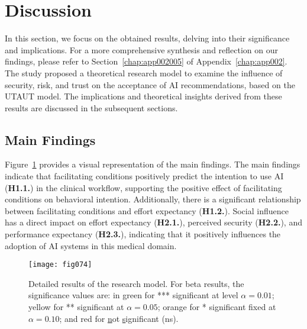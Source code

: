 \section{Discussion}
\label{sec:chap004006}

In this section, we focus on the obtained results, delving into their significance and implications.
For a more comprehensive synthesis and reflection on our findings, please refer to Section~\ref{chap:app002005} of Appendix~\ref{chap:app002}.
The study proposed a theoretical research model to examine the influence of security, risk, and trust on the acceptance of \ac{AI} recommendations, based on the \ac{UTAUT} model.
The implications and theoretical insights derived from these results are discussed in the subsequent sections.

\subsection{Main Findings}
\label{sec:chap004006001}

Figure~\ref{fig:fig074} provides a visual representation of the main findings.
The main findings indicate that facilitating conditions positively predict the intention to use \ac{AI} ({\bf H1.1.}) in the clinical workflow, supporting the positive effect of facilitating conditions on behavioral intention.
Additionally, there is a significant relationship between facilitating conditions and effort expectancy ({\bf H1.2.}).
Social influence has a direct impact on effort expectancy ({\bf H2.1.}), perceived security ({\bf H2.2.}), and performance expectancy ({\bf H2.3.}), indicating that it positively influences the adoption of \ac{AI} systems in this medical domain.

\begin{figure}[htpb]
\centering
\texttt{[image: fig074]}
\caption{Detailed results of the research model. For beta results, the significance values are: in green for *** significant at level $\alpha = 0.01$; yellow for ** significant at $\alpha = 0.05$; orange for * significant fixed at $\alpha = 0.10$; and red for \underline{n}ot \underline{s}ignificant (ns).}
\label{fig:fig074}
\end{figure}

